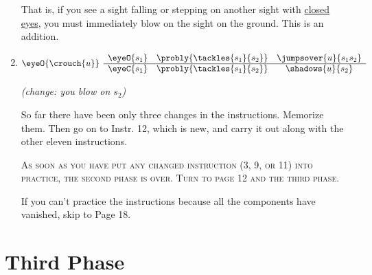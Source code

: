 \begin{enumerate}
\vfill
That is, if you see a sight falling or stepping on another sight with \uline{closed eyes}, you must immediately blow on the sight on the ground. This is an addition.
\vfill
\item \[
  \eyeO{\crouch{u}}\:\:
  \begin{array}{c c c}
    \eyeO{s_1} & \probly{\tackles{s_1}{s_2}} &
      \jumpsover{u}{s_1 s_2} \\
    \hline
    \eyeC{s_1} & \probly{\tackles{s_1}{s_2}} &
      \shadows{u}{s_2} \\
  \end{array}
\]

\vfill
{}
  {\emph{(change: you blow on $s_2$)}}

\vfill
So far there have been only three changes in the instructions. Memorize 
them. Then go on to Instr. 12, which is new, and carry it out along with the 
other eleven instructions. 

\vfill
\textsc{As soon as you have put any changed instruction (3, 9, or 11) into practice,
the second phase is over. Turn to page 12 and the third phase.}

\vfill
If you can't practice the instructions because all the components have 
vanished, skip to Page 18. 

\vfill

\end{enumerate}

\clearpage 


\section{Third Phase}


